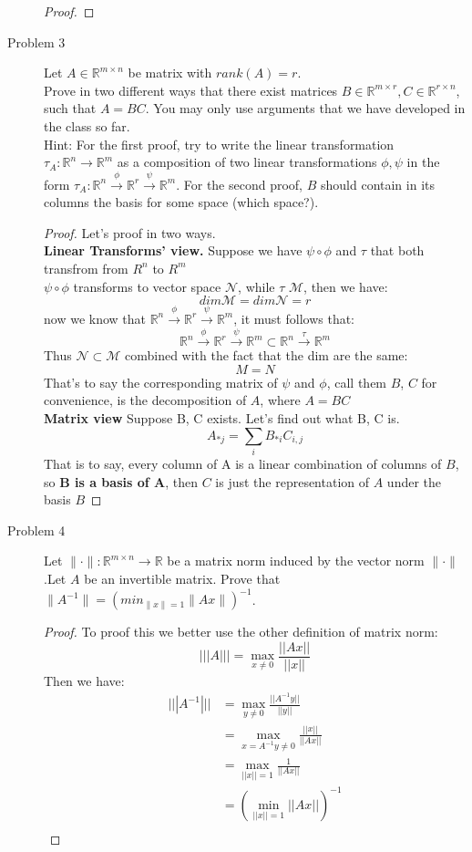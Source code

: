 \documentclass{article}
\begin{document}
\begin{description}
\begin{proof}
	\end{proof}		

	\item[Problem 3] Let $A\in\mathbb{R}^{m\times n}$ be matrix with $rank(A) = r$.\\
Prove in two different ways that there exist matrices $B\in\mathbb{R}^{m\times r},C\in\mathbb{R}^{r\times n}$, such that $A=BC$. You may only use arguments that we have developed in the class so far.\\
Hint: For the first proof, try to write the linear transformation $\tau_A:\mathbb{R}^n\to\mathbb{R}^m$ as a composition of two linear transformations $\phi,\psi$ in the form
$\tau_A:\mathbb{R}^n\xrightarrow{\phi}\mathbb{R}^r\xrightarrow{\psi}\mathbb{R}^m$. For the second proof, $B$ should contain in its columns the basis for some space (which space?).
	\begin{proof}
		Let's proof in two ways.\\
		\textbf{Linear Transforms' view.}
			Suppose we have $\psi\circ\phi$ and $\tau$ that both transfrom from $R^n$ to $R^m$\\
			$\psi\circ\phi$ transforms to vector space $\mathcal{N}$, while $\tau$ $\mathcal{M}$, then we have:
			$$ dim \mathcal{M} = dim \mathcal{N} = r$$
			now we know that $\mathbb{R}^n\xrightarrow{\phi}\mathbb{R}^r\xrightarrow{\psi}\mathbb{R}^m$, it must follows that:
			$$\mathbb{R}^n\xrightarrow{\phi}\mathbb{R}^r\xrightarrow{\psi}\mathbb{R}^m \subset \mathbb{R}^n\xrightarrow{\tau}\mathbb{R}^m$$
			Thus $\mathcal{N} \subset \mathcal{M}$
			combined with the fact that the dim are the same:
			$$M = N$$
			That's to say the corresponding matrix of $\psi$ and $\phi$, call them $B$, $C$ for convenience, is the decomposition of $A$, where $A = BC$ \\
		\textbf{Matrix view}
			Suppose B, C exists. Let's find out what B, C is.
			$$A_{*j} = \sum_i B_{*i}C_{i,j}$$
			That is to say, every column of A is a linear combination of columns of $B$, so \textbf{B is a basis of A}, then $C$ is just the representation of $A$ under the basis $B$
	\end{proof}

	\item[Problem 4] Let $\|\cdot\|:\mathbb{R}^{m\times n}\to\mathbb{R}$ be a matrix norm induced by the vector norm $\|\cdot\|$.Let $A$ be an invertible matrix. Prove that $\|A^{-1}\|=(min_{\|x\|=1}\|Ax\|)^{-1}$.
	\begin{proof}
		To proof this we better use the other definition of matrix norm:
		$$|||A||| = \max_{x \neq 0} \frac{||Ax||}{||x||}$$
		Then we have:
		\begin{equation}\begin{aligned}
			|||A^{-1}||| 
			& = \max_{y \neq 0} \frac{||A^{-1}y||}{||y||} \\
			& = \max_{x = A^{-1}y \neq 0} \frac{||x||}{||Ax||} \\
			& = \max_{||x|| = 1} \frac{1}{||Ax||} \\
			& = (\min_{||x|| = 1} ||Ax||) ^{-1} \\
		\end{aligned}\end{equation}


\end{proof}
\end{description}
\end{document}
